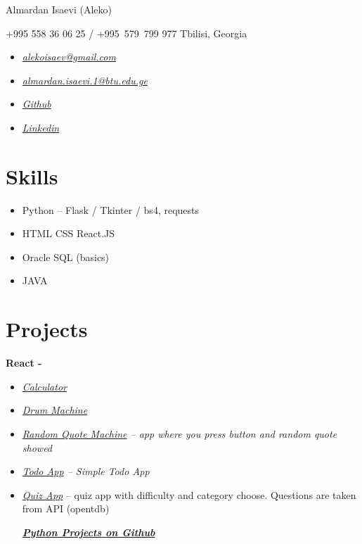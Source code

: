 \documentclass[]{article}
\date{}
\begin{document}
Almardan Isaevi (Aleko)

+995 558 36 06 25 / +995~579~799 977 \textbar{} Tbilisi, Georgia

\begin{itemize}
\item
  \href{mailto:alekoisaev@gmail.com}{\emph{alekoisaev@gmail.com}}
\item
  \href{mailto:almardan.isaevi.1@btu.edu.ge}{\emph{almardan.isaevi.1@btu.edu.ge}}
\item
  \href{https://github.com/alekoisaev}{\emph{Github}}
\item
  \href{https://www.linkedin.com/in/almardan-isaev/}{\emph{Linkedin}}
\end{itemize}

\section{Skills}\label{skills}

\begin{itemize}
\item
  Python -- Flask / Tkinter / bs4, requests
\item
  HTML \textbar{} CSS \textbar{} React.JS
\item
  Oracle SQL (basics)
\item
  JAVA
\end{itemize}

\section{Projects }\label{projects}

\textbf{React - }

\begin{itemize}
\item
  \href{https://alekoisaev.github.io/React.js-Calculator/}{\emph{Calculator
  }}
\item
  \href{https://alekoisaev.github.io/Drum-Machine/}{\emph{Drum Machine}}
\item
  \emph{\href{https://alekoisaev.github.io/Random-Quote-Machine/}{Random
  Quote Machine} -- app where you press button and random quote showed}
\item
  \emph{\href{https://alekoisaev.github.io/todo-app/}{Todo App} --
  Simple Todo App}
\item
  \emph{\href{https://github.com/alekoisaev/api-app}{Quiz App}} -- quiz
  app with difficulty and category choose. Questions are taken from API
  (opentdb)

  \href{https://github.com/alekoisaev/Python-Projects}{\textbf{\emph{Python
  Projects on Github}}}
\end{itemize}
\end{document}
